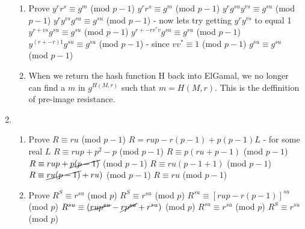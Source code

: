 \documentclass{assignment}
\begin{document}
\begin{problemlist}
\begin{problem}
\begin{enumerate}
\begin{enumerate}
\item
Prove $y^rr^s \equiv g^m$ (mod $p-1$) \newline
$y^rr^s \equiv g^m$ (mod $p-1$)  \newline
$y^rg^{su}y^{vs} \equiv g^{su}$ (mod $p-1$)  \newline
$y^ry^{vs}g^{su} \equiv g^{su}$ (mod $p-1$) - now lets try getting $y^ry^{vs}$ to equal 1 \newline
$y^{r + vs}g^{su} \equiv g^{su}$ (mod $p-1$) \newline
$y^{r + -rv^{*}v}g^{su} \equiv g^{su}$ (mod $p-1$) \newline
$y^{(r + -r)1}g^{su} \equiv g^{su}$ (mod $p-1$) - since $vv^* \equiv 1$ (mod $p-1$) \newline
$g^{su} \equiv g^{su}$ (mod $p-1$)\newline

\item
When we return the hash function H back into ElGamal, we no longer can find a $m$ in $g^{H(M,r)}$ such that $m = H(M,r)$. This is the deffinition of pre-image resistance.

\end{enumerate}

\clearpage

\item

\begin{enumerate}

\item
Prove $R \equiv ru$ (mod $p-1$) \newline
$ R = rup -r(p-1) + p(p-1)L$ - for some real $L$  \newline
$ R \equiv rup + p^2 - p$ (mod $p-1$) \newline
$ R \equiv p(ru + p - 1)$ (mod $p-1$) \newline
$ R \equiv rup + \cancel{p(p - 1)}$ (mod $p-1$) \newline
$ R \equiv ru(p - 1 + 1)$ (mod $p-1$) \newline
$ R \equiv \cancel{ru(p - 1)} + ru)$ (mod $p-1$) \newline
$ R \equiv ru$ (mod $p-1$) \newline

\item
Prove $R^S \equiv r^{su}$ (mod $p$) \newline
$R^S \equiv r^{su}$ (mod $p$) \newline
$R^{su} \equiv [rup - r(p-1)]^{su}$ (mod $p$) \newline
$R^{su} \equiv (\cancel{rup^{su}} -\cancel{rp^{su}} + r^{su})$ (mod $p$) \newline
$R^{su} \equiv  r^{su}$ (mod $p$) \newline
$R^{S} \equiv  r^{su}$ (mod $p$) \newline



\end{enumerate}
\end{enumerate}
\end{problem}
\end{problemlist}
\end{document}
